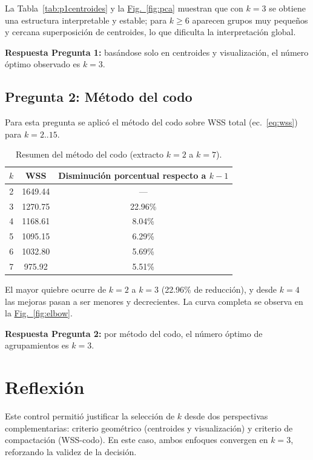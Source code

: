 \documentclass[10pt,a4paper]{article}
\begin{document}
La Tabla~\ref{tab:p1centroides} y la \hyperref[fig:pca]{Fig.~\ref*{fig:pca}} muestran que con $k=3$ se obtiene una estructura interpretable y estable; para $k \ge 6$ aparecen grupos muy pequeños y cercana superposición de centroides, lo que dificulta la interpretación global.

\textbf{Respuesta Pregunta 1:} basándose solo en centroides y visualización, el número óptimo observado es \textbf{$k=3$}.

\subsection{Pregunta 2: Método del codo}

Para esta pregunta se aplicó el método del codo sobre WSS total (ec.~\ref{eq:wss}) para $k=2..15$.

\begin{table}[H]
\centering
\footnotesize
\begin{tabular}{c c c}
\toprule
$k$ & WSS & Disminución porcentual respecto a $k-1$ \\
\midrule
2 & 1649.44 & --- \\
3 & 1270.75 & 22.96\% \\
4 & 1168.61 & 8.04\% \\
5 & 1095.15 & 6.29\% \\
6 & 1032.80 & 5.69\% \\
7 & 975.92 & 5.51\% \\
\bottomrule
\end{tabular}
\caption{Resumen del método del codo (extracto $k=2$ a $k=7$).}
\label{tab:elbow}
\end{table}

El mayor quiebre ocurre de $k=2$ a $k=3$ (22.96\% de reducción), y desde $k=4$ las mejoras pasan a ser menores y decrecientes. La curva completa se observa en la \hyperref[fig:elbow]{Fig.~\ref*{fig:elbow}}.

\textbf{Respuesta Pregunta 2:} por método del codo, el número óptimo de agrupamientos es \textbf{$k=3$}.

\section{Reflexión}

Este control permitió justificar la selección de $k$ desde dos perspectivas complementarias: criterio geométrico (centroides y visualización) y criterio de compactación (WSS-codo). En este caso, ambos enfoques convergen en $k=3$, reforzando la validez de la decisión.
\end{document}

